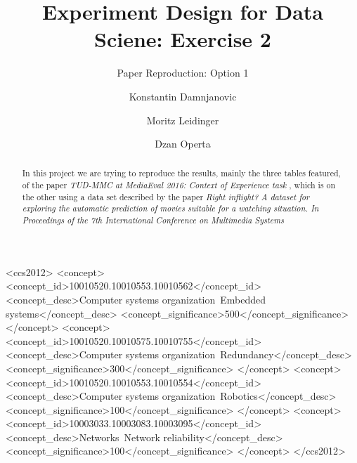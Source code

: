 \documentclass[sigconf]{acmart}
\begin{document}
\title{Experiment Design for Data Sciene: Exercise 2}
\subtitle{Paper Reproduction: Option 1}



\author{Konstantin Damnjanovic}

\author{Moritz Leidinger}

\author{Dzan Operta}



\begin{abstract}
In this project we are trying to reproduce the results, mainly the three tables featured, of the paper  \textit{TUD-MMC at MediaEval 2016: Context of Experience task} \cite{aa}, which is on the other using a data set described by the paper \textit{Right inﬂight? A dataset for exploring the automatic prediction of movies suitable for a watching situation. In Proceedings of the 7th International Conference on Multimedia Systems} \cite{bb}
\end{abstract}

\begin{CCSXML}
<ccs2012>
 <concept>
  <concept_id>10010520.10010553.10010562</concept_id>
  <concept_desc>Computer systems organization~Embedded systems</concept_desc>
  <concept_significance>500</concept_significance>
 </concept>
 <concept>
  <concept_id>10010520.10010575.10010755</concept_id>
  <concept_desc>Computer systems organization~Redundancy</concept_desc>
  <concept_significance>300</concept_significance>
 </concept>
 <concept>
  <concept_id>10010520.10010553.10010554</concept_id>
  <concept_desc>Computer systems organization~Robotics</concept_desc>
  <concept_significance>100</concept_significance>
 </concept>
 <concept>
  <concept_id>10003033.10003083.10003095</concept_id>
  <concept_desc>Networks~Network reliability</concept_desc>
  <concept_significance>100</concept_significance>
 </concept>
</ccs2012>
\end{CCSXML}
\end{document}
